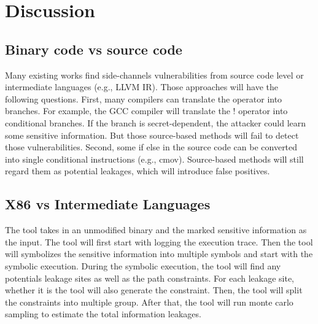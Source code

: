 \section{Discussion}

\subsection{Binary code vs source code}
Many existing works find side-channels vulnerabilities from source code level 
or intermediate languages (e.g., LLVM IR). Those approaches will have the following questions. 
First, many compilers can translate the operator into branches. For example, 
the GCC compiler will translate the ! operator into conditional branches. 
If the branch is secret-dependent, the attacker could learn some sensitive information.
But those source-based methods will fail to detect those vulnerabilities. 
Second, some if else in the source code can be converted into single conditional 
instructions (e.g., cmov). Source-based methods will still regard them as potential leakages, 
which will introduce false positives.

\subsection{X86 vs Intermediate Languages}
The tool takes in an unmodified binary and the marked sensitive information as the input. 
The tool will first start with logging the execution trace. Then the tool will symbolizes the 
sensitive information into multiple symbols and start with the symbolic execution. 
During the symbolic execution, the tool will find any potentials leakage sites as well as the path constraints. 
For each leakage site, whether it is  the tool will also generate the constraint. 
Then, the tool will split the constraints into multiple group. After that, 
the tool will run monte carlo sampling to estimate the total information leakages.
